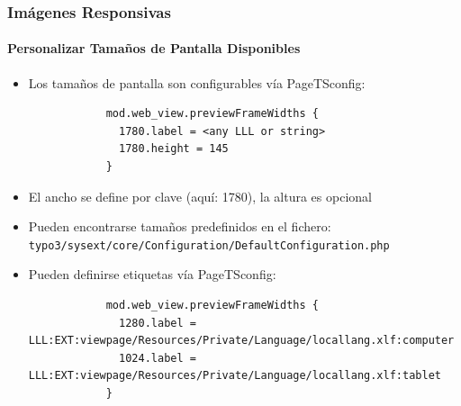 
\begin{frame}[fragile]
	\frametitle{Imágenes Responsivas}
	\framesubtitle{Personalizar Tamaños de Pantalla Disponibles}

	\begin{itemize}
		\item Los tamaños de pantalla son configurables vía PageTSconfig:


		\begin{lstlisting}
			mod.web_view.previewFrameWidths {
			  1780.label = <any LLL or string>
			  1780.height = 145
			}
		\end{lstlisting}

		\item El ancho se define por clave (aquí: 1780), la altura es opcional
		\item Pueden encontrarse tamaños predefinidos en el fichero:\newline
			\small\texttt{typo3/sysext/core/Configuration/DefaultConfiguration.php}\normalsize
		\item Pueden definirse etiquetas vía PageTSconfig:

		\begin{lstlisting}
			mod.web_view.previewFrameWidths {
			  1280.label = LLL:EXT:viewpage/Resources/Private/Language/locallang.xlf:computer
			  1024.label = LLL:EXT:viewpage/Resources/Private/Language/locallang.xlf:tablet
			}
		\end{lstlisting}

	\end{itemize}

\end{frame}


